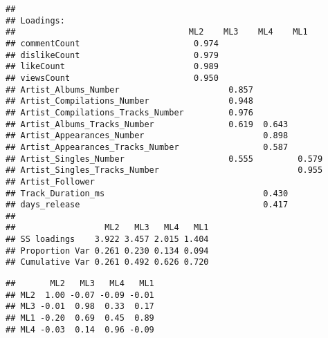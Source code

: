 \documentclass[
]{article}
\newenvironment{Shaded}{\begin{snugshade}}{\end{snugshade}}
\newcommand{\CommentTok}[1]{\textcolor[rgb]{0.56,0.35,0.01}{\textit{#1}}}
\newcommand{\KeywordTok}[1]{\textcolor[rgb]{0.13,0.29,0.53}{\textbf{#1}}}
\newcommand{\NormalTok}[1]{#1}
\begin{document}
\begin{verbatim}
## 
## Loadings:
##                                   ML2    ML3    ML4    ML1   
## commentCount                       0.974                     
## dislikeCount                       0.979                     
## likeCount                          0.989                     
## viewsCount                         0.950                     
## Artist_Albums_Number                      0.857              
## Artist_Compilations_Number                0.948              
## Artist_Compilations_Tracks_Number         0.976              
## Artist_Albums_Tracks_Number               0.619  0.643       
## Artist_Appearances_Number                        0.898       
## Artist_Appearances_Tracks_Number                 0.587       
## Artist_Singles_Number                     0.555         0.579
## Artist_Singles_Tracks_Number                            0.955
## Artist_Follower                                              
## Track_Duration_ms                                0.430       
## days_release                                     0.417       
## 
##                  ML2   ML3   ML4   ML1
## SS loadings    3.922 3.457 2.015 1.404
## Proportion Var 0.261 0.230 0.134 0.094
## Cumulative Var 0.261 0.492 0.626 0.720
\end{verbatim}

\begin{Shaded}
\end{Shaded}

\begin{verbatim}
##       ML2   ML3   ML4   ML1
## ML2  1.00 -0.07 -0.09 -0.01
## ML3 -0.01  0.98  0.33  0.17
## ML1 -0.20  0.69  0.45  0.89
## ML4 -0.03  0.14  0.96 -0.09
\end{verbatim}
\end{document}
